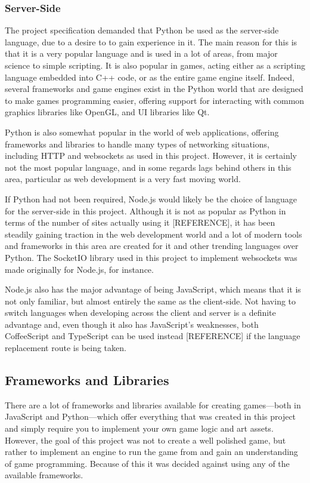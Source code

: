 \subsubsection{Server-Side}
The project specification demanded that Python be used as the server-side language, due to a desire to to gain experience in it. The main reason for this is that it is a very popular language and is used in a lot of areas, from major science to simple scripting. It is also popular in games, acting either as a scripting language embedded into C++ code, or as the entire game engine itself. Indeed, several frameworks and game engines exist in the Python world that are designed to make games programming easier, offering support for interacting with common graphics libraries like OpenGL, and UI libraries like Qt.

Python is also somewhat popular in the world of web applications, offering frameworks and libraries to handle many types of networking situations, including HTTP and websockets as used in this project. However, it is certainly not the most popular language, and in some regards lags behind others in this area, particular as web development is a very fast moving world.

If Python had not been required, Node.js would likely be the choice of language for the server-side in this project. Although it is not as popular as Python in terms of the number of sites actually using it [REFERENCE], it has been steadily gaining traction in the web development world and a lot of modern tools and frameworks in this area are created for it and other trending languages over Python. The SocketIO library used in this project to implement websockets was made originally for Node.js, for instance.

Node.js also has the major advantage of being JavaScript, which means that it is not only familiar, but almost entirely the same as the client-side. Not having to switch languages when developing across the client and server is a definite advantage and, even though it also has JavaScript's weaknesses, both CoffeeScript and TypeScript can be used instead [REFERENCE] if the language replacement route is being taken.

\subsection{Frameworks and Libraries}
There are a lot of frameworks and libraries available for creating games---both in JavaScript and Python---which offer everything that was created in this project and simply require you to implement your own game logic and art assets. However, the goal of this project was not to create a well polished game, but rather to implement an engine to run the game from and gain an understanding of game programming. Because of this it was decided against using any of the available frameworks.


